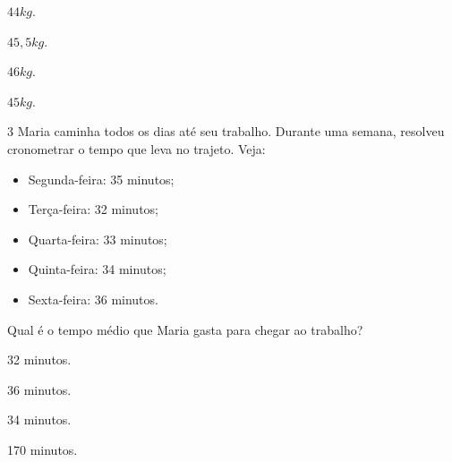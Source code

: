 \begin{escolha}[itemsep=0pt]
\item $44 kg$.
\item $45,5 kg$.
\item $46 kg$.
\item $45 kg$.
\end{escolha}











\num{3} Maria caminha todos os dias até seu trabalho. Durante uma semana,
resolveu cronometrar o tempo que leva no trajeto. Veja:

\begin{itemize}
\item Segunda-feira: 35 minutos;

\item Terça-feira: 32 minutos;

\item Quarta-feira: 33 minutos;

\item Quinta-feira: 34 minutos;

\item Sexta-feira: 36 minutos.
\end{itemize}

Qual é o tempo médio que Maria gasta para chegar ao trabalho?

\begin{escolha}[itemsep=0pt]
\item 32 minutos.
\item 36 minutos.
\item 34 minutos.
\item 170 minutos.
\end{escolha}

